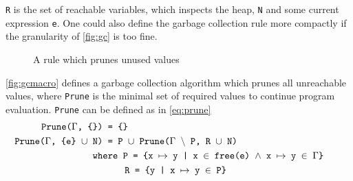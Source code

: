 \texttt{R} is the set of reachable variables, which inspects the heap, \texttt{N} and some current expression \texttt{e}.
One could also define the garbage collection rule more compactly if the granularity of \autoref{fig:gc} is too fine.
\begin{figure}[ht]
  \begin{mdframed}
    \begin{prooftree}
    \end{prooftree}   
  \end{mdframed}
  \caption{A rule which prunes unused values}
  \label{fig:gcmacro}
\end{figure}
\autoref{fig:gcmacro} defines a garbage collection algorithm which prunes all unreachable values, where \texttt{Prune} is the minimal set of required values to continue program evaluation.
\texttt{Prune} can be defined as in \autoref{eq:prune}
\begin{align}
  \texttt{Prune($\Gamma$, \{\}) }&\texttt{= \{\}} \label{eq:prune}\\
  \texttt{Prune($\Gamma$, \{e\} $\cup$ N) }&\texttt{=  P $\cup$ Prune($\Gamma$ $\backslash$ P, R $\cup$ N)} \tag*{}\\
  \wherecase{P = \{x $\mapsto$ y | x $\in$ free(e) $\land$ x $\mapsto$ y $\in$ $\Gamma$\}} \tag*{}\\
  \extracase{R = \{y | x $\mapsto$ y $\in$ P\}} \tag*{}\\
\end{align}


